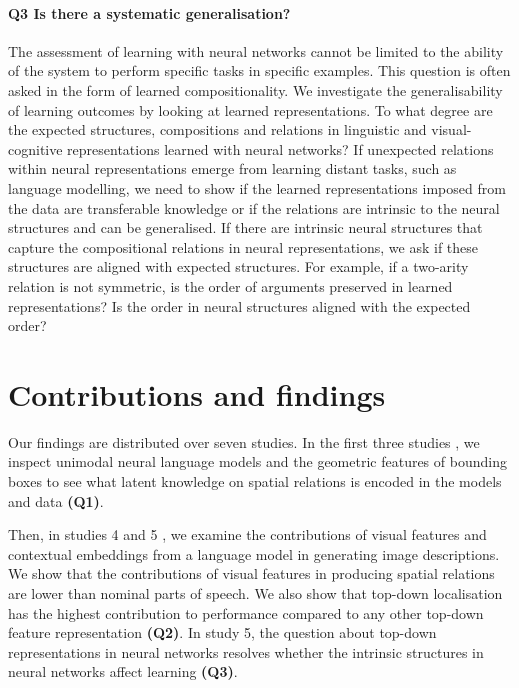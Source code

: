 \paragraph{Q3 Is there a systematic generalisation?} 
The assessment of learning with neural networks cannot be limited to the ability of the system to perform specific tasks in specific examples. 
This question is often asked in the form of learned compositionality. 
We investigate the generalisability of learning outcomes by looking at learned representations. 
To what degree are the expected structures, compositions and relations in linguistic and visual-cognitive representations learned with neural networks? 
If unexpected relations within neural representations emerge from learning distant tasks, such as language modelling, we need to show if the learned representations imposed from the data are transferable knowledge or if the relations are intrinsic to the neural structures and can be generalised.
If there are intrinsic neural structures that capture the compositional relations in neural representations, we ask if these structures are aligned with expected structures. 
For example, if a two-arity relation is not symmetric, is the order of arguments preserved in learned representations?
Is the order in neural structures aligned with the expected order?
















\section{Contributions and findings}
\label{sec:intro:contributions}





Our findings are distributed over seven studies. 
In the first three studies
\citep{dobnik-etal-2018-exploring,ghanimifard-dobnik-2019-neural,dobnik-ghanimifard-2020-geo},
we inspect unimodal neural language models and the geometric features of bounding boxes to see what latent knowledge on spatial relations is encoded in the models and data \textbf{(Q1)}. 

Then, in studies 4 and 5  \citep{ghanimifard2018knowing,ghanimifard-dobnik-2019-what},
we examine the contributions of visual features and contextual embeddings from a language model in generating image descriptions. We show that the contributions of visual features in producing spatial relations are lower than nominal parts of speech. We also show that top-down localisation has the highest contribution to performance compared to any other top-down feature representation \textbf{(Q2)}.  
In study 5, the question about top-down representations in neural networks resolves whether the intrinsic structures in neural networks affect learning \textbf{(Q3)}. 

